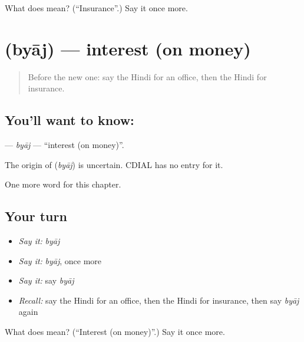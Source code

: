 \begin{tcolorbox}[breakable,colback=teal!4,colframe=teal!35!black,title={Before you move on}]
What does  mean? (\textquotedblleft{}Insurance\textquotedblright{}.) Say it once more.
\end{tcolorbox}
\section[\texorpdfstring{\hi{ब्याज} (byāj)}{ब्याज (byāj)}]{ (byāj) — interest (on money)}

\label{lesson:HI-C271-byaj}



\begin{quote}
Before the new one: say the Hindi for an office, then the Hindi for insurance.
\end{quote}

\subsection*{You'll want to know: }
\textbf{} — \emph{byāj} — \textquotedblleft{}interest (on money)\textquotedblright{}.

\begin{cousinweb}
The origin of \textbf{} (\emph{byāj}) is uncertain. CDIAL has no entry for it.
\end{cousinweb}

\begin{grammarlens}[title={What you've built}]
One more word for this chapter.
\end{grammarlens}

\subsection*{Your turn}
\begin{itemize}
\raggedright
  \item \emph{Say it:} \emph{byāj}
  \item \emph{Say it:} \emph{byāj}, once more
  \item \emph{Say it:} say \emph{byāj}
  \item \emph{Recall:} say the Hindi for an office, then the Hindi for insurance, then say \emph{byāj} again
\end{itemize}

\begin{tcolorbox}[breakable,colback=teal!4,colframe=teal!35!black,title={Before you move on}]
What does  mean? (\textquotedblleft{}Interest (on money)\textquotedblright{}.) Say it once more.
\end{tcolorbox}
